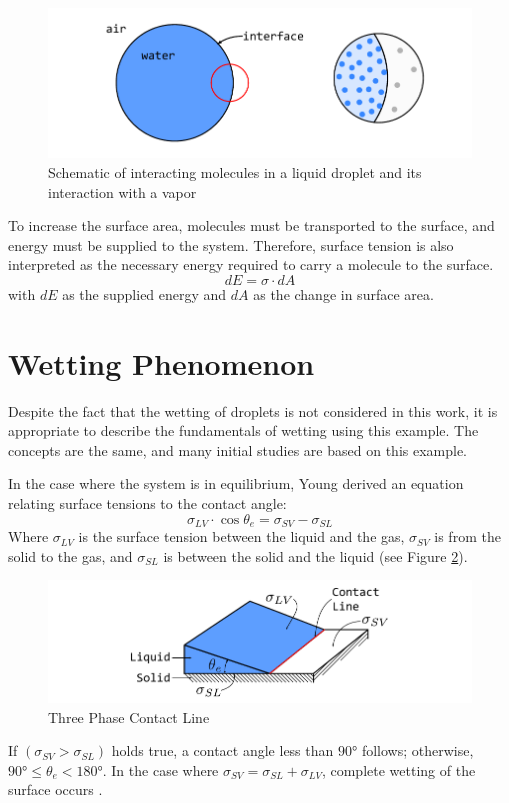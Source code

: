 \begin{figure}[h]
    \centering
    \includegraphics[width=.9\textwidth]{Pictures/moleculesAhesionCohesion_Wetting.pdf}
    \caption{Schematic of interacting molecules in a liquid droplet and its interaction with a vapor}
    \label{fig: WettingTheory_SurfaceTensionMolecules}
\end{figure}
To increase the surface area, molecules must be transported to the surface, and energy must be supplied to the system. Therefore, surface tension is also interpreted as the necessary energy required to carry a molecule to the surface.
\begin{equation}
 dE = \sigma \cdot dA
\end{equation}
with \(dE\) as the supplied energy and \(dA\) as the change in surface area.


\section{Wetting Phenomenon}
Despite the fact that the wetting of droplets is not considered in this work, it is appropriate to describe the fundamentals of wetting using this example. The concepts are the same, and many initial studies are based on this example.

In the case where the system is in equilibrium, Young  derived an equation relating surface tensions to the contact angle:
\begin{equation}
    \sigma_{LV} \cdot \cos\theta_e = \sigma_{SV}-\sigma_{SL}
    \label{eq: YoungsEQ}
\end{equation}
Where $\sigma_{LV}$ is the surface tension between the liquid and the gas, $\sigma_{SV}$ is from the solid to the gas, and $\sigma_{SL}$ is between the solid and the liquid (see Figure \ref{fig: YoungsLaw_ThreePhaseContactLine}).
\begin{figure}[h]
    \centering
    \includegraphics[width=.9\textwidth]{Pictures/YoungsLaw.pdf}
    \caption{Three Phase Contact Line}
    \label{fig: YoungsLaw_ThreePhaseContactLine}
\end{figure}
If $(\sigma_{SV}>\sigma_{SL})$ holds true, a contact angle less than $90°$ follows; otherwise, $90°\leq \theta_e<180°$. In the case where $\sigma_{SV}=\sigma_{SL}+\sigma_{LV}$, complete wetting of the surface occurs \cite{buttPhysicsChemistryInterfaces}.

